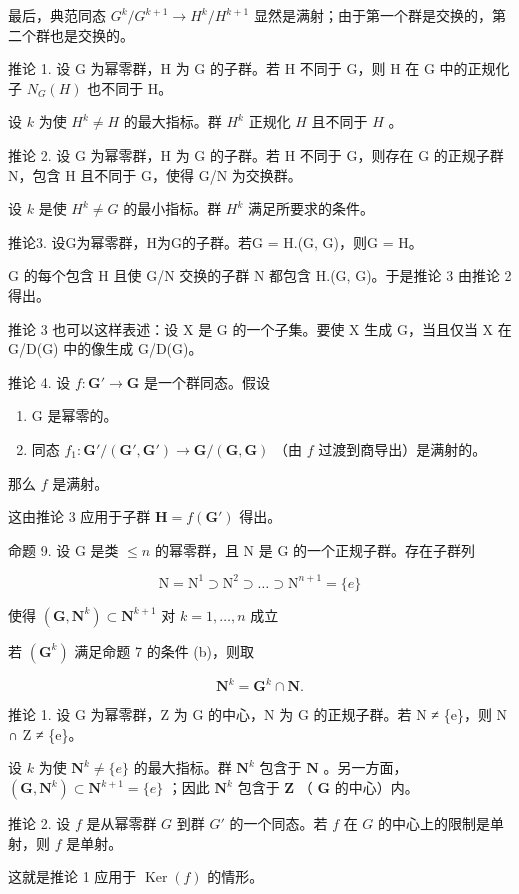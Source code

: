 最后，典范同态 \(G^{k}/G^{k+1} \to H^{k}/H^{k+1}\) 显然是满射；由于第一个群是交换的，第二个群也是交换的。

推论 1. 设 G 为幂零群，H 为 G 的子群。若 H 不同于 G，则 H 在 G 中的正规化子 \(N_{G}(H)\) 也不同于 H。

设 \(k\) 为使 \(H^{k} \neq H\) 的最大指标。群 \(H^{k}\) 正规化 \(H\) 且不同于 \(H\) 。

推论 2. 设 G 为幂零群，H 为 G 的子群。若 H 不同于 G，则存在 G 的正规子群 N，包含 H 且不同于 G，使得 G/N 为交换群。

设 \(k\) 是使 \(H^k \neq G\) 的最小指标。群 \(H^k\) 满足所要求的条件。

推论3. 设G为幂零群，H为G的子群。若G = H.(G, G)，则G = H。

G 的每个包含 H 且使 G/N 交换的子群 N 都包含 H.(G, G)。于是推论 3 由推论 2 得出。

推论 3 也可以这样表述：设 X 是 G 的一个子集。要使 X 生成 G，当且仅当 X 在 G/D(G) 中的像生成 G/D(G)。

推论 4. 设 \(f: \mathbf{G}' \to \mathbf{G}\) 是一个群同态。假设

\begin{enumerate}
\def\labelenumi{(\alph{enumi})}
\item
  G 是幂零的。
\item
  同态 \(f_1 \colon \mathbf{G}' / (\mathbf{G}', \mathbf{G}') \to \mathbf{G} / (\mathbf{G}, \mathbf{G})\) （由 \(f\) 过渡到商导出）是满射的。
\end{enumerate}

那么 \(f\) 是满射。

这由推论 3 应用于子群 \(\mathbf{H} = f(\mathbf{G}')\) 得出。

命题 9. 设 G 是类 \(\leqslant n\) 的幂零群，且 N 是 G 的一个正规子群。存在子群列

\[
\mathrm{N} = \mathrm{N} ^ {1} \supset \mathrm{N} ^ {2} \supset \dots \supset \mathrm{N} ^ {n + 1} = \{e \}
\]

使得 \((\mathbf{G},\mathbf{N}^k)\subset \mathbf{N}^{k + 1}\) 对 \(k = 1,\dots ,n\) 成立

若 \((\mathbf{G}^k)\) 满足命题 7 的条件 (b)，则取

\[
\mathbf {N} ^ {k} = \mathbf {G} ^ {k} \cap \mathbf {N}.
\]

推论 1. 设 G 为幂零群，Z 为 G 的中心，N 为 G 的正规子群。若 N ≠ \{e\}，则 N ∩ Z ≠ \{e\}。

设 \(k\) 为使 \(\mathbf{N}^k \neq \{e\}\) 的最大指标。群 \(\mathbf{N}^k\) 包含于 \(\mathbf{N}\) 。另一方面， \((\mathbf{G}, \mathbf{N}^k) \subset \mathbf{N}^{k+1} = \{e\}\) ；因此 \(\mathbf{N}^k\) 包含于 \(\mathbf{Z}\) （ \(\mathbf{G}\) 的中心）内。

推论 2. 设 \(f\) 是从幂零群 \(G\) 到群 \(G'\) 的一个同态。若 \(f\) 在 \(G\) 的中心上的限制是单射，则 \(f\) 是单射。

这就是推论 1 应用于 \(\operatorname{Ker}(f)\) 的情形。

